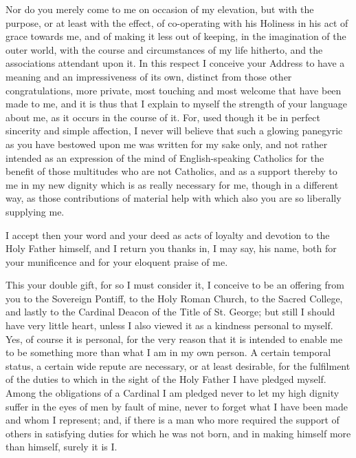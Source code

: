 Nor do you merely come to me on occasion of my elevation, but with
the purpose, or at least with the effect, of co-operating with his
Holiness in his act of grace towards me, and of making it less out of
keeping, in the imagination of the outer world, with the course and
circumstances of my life hitherto, and the associations attendant upon
it. In this respect I conceive your Address to have a meaning and an
impressiveness of its own, distinct from those other congratulations,
more private, most touching and most welcome that have been made to
me, and it is thus that I explain to myself the strength of your
language about me, as it occurs in the course of it. For, used though
it be in perfect sincerity and simple affection, I never will believe
that such a glowing panegyric as you have bestowed upon me was written
for my sake only, and not rather intended as an expression of the mind
of English-speaking Catholics for the benefit of those multitudes who
are not Catholics, and as a support thereby to me in my new dignity
which is as really necessary for me, though in a different way, as
those contributions of material help with which also you are so
liberally supplying me.

I accept then your word and your deed as acts of loyalty and
devotion to the Holy Father himself, and I return you thanks in, I may
say, his name, both for your munificence and for your eloquent praise
of me.

This your double gift, for so I must consider it, I conceive to be
an offering from you to the Sovereign Pontiff, to the Holy Roman
Church, to the Sacred College, and lastly to the Cardinal Deacon of
the Title of St. George; but still I should have very little heart,
unless I also viewed it as a kindness personal to myself. Yes, of
course it is personal, for the very reason that it is intended to
enable me to be something more than what I am in my own person. A
certain temporal status, a certain wide repute are necessary, or at
least desirable, for the fulfilment of the duties to which in the
sight of the Holy Father I have pledged myself. Among the obligations
of a Cardinal I am pledged never to let my high dignity suffer in the
eyes of men by fault of mine, never to forget what I have been made
and whom I represent; and, if there is a man who more required
the support of others in satisfying duties for which he was not born,
and in making himself more than himself, surely it is I.

